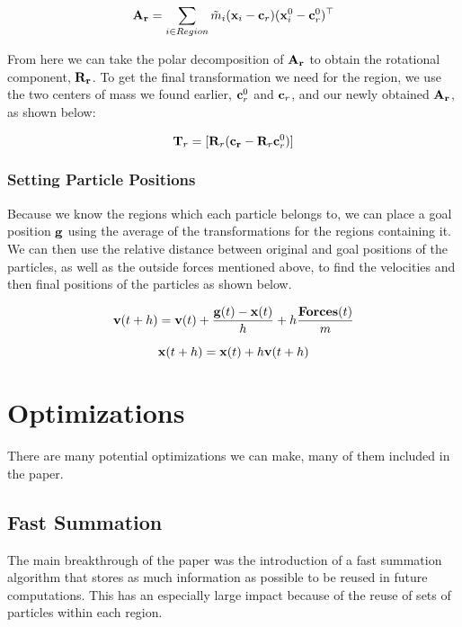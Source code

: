 \documentclass[12pt,a4paper]{amsart}
\begin{document}
	\[ \bold{A_r} = \sum_{i \in Region} \tilde{m}_i ( \bold{x}_i - \bold{c}_r ) ( \bold{x}_i^0 - \bold{c}_r^0 )^\top \]
	
	From here we can take the polar decomposition of $\bold{A_r}$ to obtain the rotational component, $\bold{R_{r}}$. To get the final transformation we need for the region, we use the two centers of mass we found earlier, $\bold{c}_r^0$ and $\bold{c}_r$, and our newly obtained $\bold{A_r}$, as shown below:
	
	\[ \bold{T}_r = [\bold{R}_r (\bold{c_r} - \bold{R}_r \bold{c}_r^0) ] \]
	
	\subsubsection{Setting Particle Positions}
	
	Because we know the regions which each particle belongs to, we can place a goal position $\bold{g}$ using the average of the transformations for the regions containing it. We can then use the relative distance between original and goal positions of the particles, as well as the outside forces mentioned above, to find the velocities and then final positions of the particles as shown below.
	
	\[ \bold{v}(t+h) = \bold{v}(t) + \frac{\bold{g}(t) - \bold{x}(t)}{h} + h \frac{\bold{Forces}(t)}{m} \]
	
	\[ \bold{x}(t+h) = \bold{x}(t) + h \bold{v}(t + h) \]
	
	\section{Optimizations}
	There are many potential optimizations we can make, many of them included in the \cite{rivers} paper.
	\subsection{Fast Summation}
	The main breakthrough of the paper was the introduction of a fast summation algorithm that stores as much information as possible to be reused in future computations. This has an especially large impact because of the reuse of sets of particles within each region.
	
	
	
	
\end{document}
